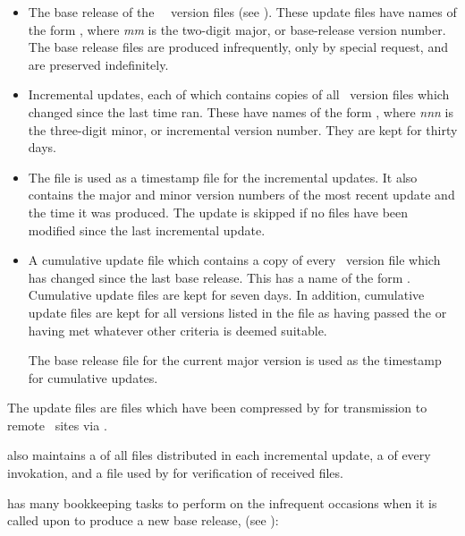\begin{itemize}
\item
   The base release of the \aipspp\ \rcs\ version files (see ).
   These update files have names of the form
   , where \textit{mm} is the two-digit
   major, or base-release version number.  The base release files are produced
   infrequently, only by special request, and are preserved indefinitely.

\item
   Incremental updates, each of which contains copies of all \rcs\ version
   files which changed since the last time  ran.  These have names
   of the form , where
   \textit{nnn} is the three-digit minor, or incremental version number.  They
   are kept for thirty days.

\item
   The  file is used as a timestamp file for the incremental
   updates.  It also contains the major and minor version numbers of the most
   recent update and the time it was produced.  The update is skipped if no
   files have been modified since the last incremental update.

\item
   A cumulative update file which contains a copy of every \rcs\ version file
   which has changed since the last base release.  This has a name of the form
   .  Cumulative update 
   files are kept for seven days.  In addition, cumulative update files
   are kept for all versions listed in the  file as having 
   passed the  or having met whatever other criteria
   is deemed suitable.

   The base release file for the current major version is used as the
   timestamp for cumulative updates.
\end{itemize}

\noindent
The update files are  files which have been compressed by
 for transmission to remote \aipspp\ sites via .

 also maintains a  of all files distributed in each
incremental update, a  of every invokation, and a 
file used by  for verification of received files.

 has many bookkeeping tasks to perform on the infrequent occasions
when it is called upon to produce a new base release, 
(see ):

